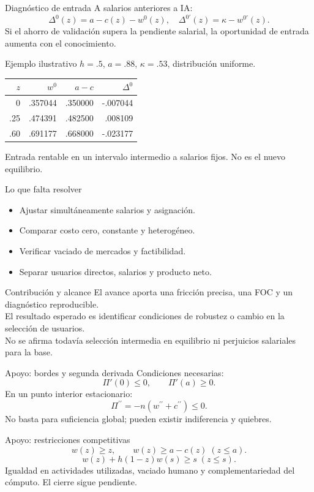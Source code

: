 \documentclass[aspectratio=169,11pt]{beamer}
\begin{document}
\begin{frame}{Diagnóstico de entrada}
A salarios anteriores a IA:\[\Delta^0(z)=a-c(z)-w^0(z),\quad \Delta^{0\prime}(z)=\kappa-w^{0\prime}(z).\] Si el ahorro de validación supera la pendiente salarial, la oportunidad de entrada aumenta con el conocimiento.
\end{frame}
\begin{frame}{Ejemplo ilustrativo}
$h=.5$, $a=.88$, $\kappa=.53$, distribución uniforme.\begin{center}\begin{tabular}{r|rrr}$z$ & $w^0$ & $a-c$ & $\Delta^0$\\\hline 0 & .357044 & .350000 & -.007044\\ .25 & .474391 & .482500 & .008109\\ .60 & .691177 & .668000 & -.023177\end{tabular}\end{center} Entrada rentable en un intervalo intermedio a salarios fijos. No es el nuevo equilibrio.
\end{frame}
\begin{frame}{Lo que falta resolver}
\begin{itemize}\item Ajustar simultáneamente salarios y asignación.\item Comparar costo cero, constante y heterogéneo.\item Verificar vaciado de mercados y factibilidad.\item Separar usuarios directos, salarios y producto neto.\end{itemize}
\end{frame}
\begin{frame}{Contribución y alcance}
El avance aporta una fricción precisa, una FOC y un diagnóstico reproducible.\\ El resultado esperado es identificar condiciones de robustez o cambio en la selección de usuarios.\\ No se afirma todavía selección intermedia en equilibrio ni perjuicios salariales para la base.
\end{frame}
\appendix
\begin{frame}{Apoyo: bordes y segunda derivada}
Condiciones necesarias:\[\Pi'(0)\leq0,\qquad\Pi'(a)\geq0.\] En un punto interior estacionario:\[\Pi^{\prime\prime}=-n(w^{\prime\prime}+c^{\prime\prime})\leq0.\] No basta para suficiencia global; pueden existir indiferencia y quiebres.
\end{frame}
\begin{frame}{Apoyo: restricciones competitivas}
\[w(z)\geq z,\qquad w(z)\geq a-c(z)\;(z\leq a).\]\[w(z)+h(1-z)w(s)\geq s\;(z\leq s).\] Igualdad en actividades utilizadas, vaciado humano y complementariedad del cómputo. El cierre sigue pendiente.
\end{frame}
\end{document}
